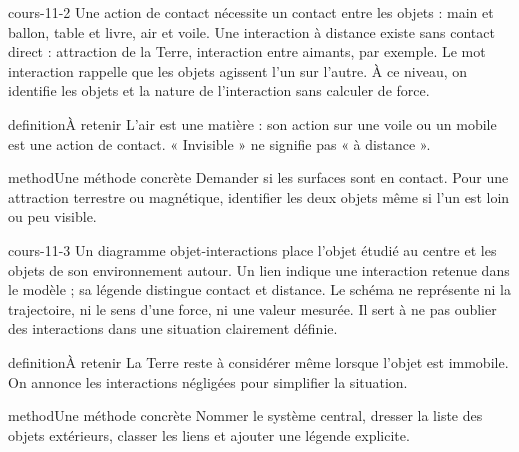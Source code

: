 \documentclass[12pt,twoside,openany]{book}
\begin{document}
\begin{pcFiche}{cours-11-2}
Une action de contact nécessite un contact entre les objets : main et ballon, table et livre, air et voile. Une interaction à distance existe sans contact direct : attraction de la Terre, interaction entre aimants, par exemple. Le mot interaction rappelle que les objets agissent l’un sur l’autre. À ce niveau, on identifie les objets et la nature de l’interaction sans calculer de force.\par
{}
\begin{pcEncadre}{definition}{À retenir}
L’air est une matière : son action sur une voile ou un mobile est une action de contact. « Invisible » ne signifie pas « à distance ».\par
\end{pcEncadre}
\begin{pcEncadre}{method}{Une méthode concrète}
Demander si les surfaces sont en contact. Pour une attraction terrestre ou magnétique, identifier les deux objets même si l’un est loin ou peu visible.\par
\end{pcEncadre}
\end{pcFiche}
\label{ch-11-cours-3}
\begin{pcFiche}{cours-11-3}
Un diagramme objet-interactions place l’objet étudié au centre et les objets de son environnement autour. Un lien indique une interaction retenue dans le modèle ; sa légende distingue contact et distance. Le schéma ne représente ni la trajectoire, ni le sens d’une force, ni une valeur mesurée. Il sert à ne pas oublier des interactions dans une situation clairement définie.\par
{}
\begin{pcEncadre}{definition}{À retenir}
La Terre reste à considérer même lorsque l’objet est immobile. On annonce les interactions négligées pour simplifier la situation.\par
\end{pcEncadre}
\begin{pcEncadre}{method}{Une méthode concrète}
Nommer le système central, dresser la liste des objets extérieurs, classer les liens et ajouter une légende explicite.\par
\end{pcEncadre}
\end{pcFiche}
\end{document}
